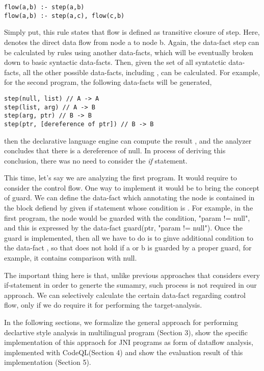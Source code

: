 \begin{lstlisting}[style=myDatalog,xleftmargin=2.5em]
flow(a,b) :- step(a,b)
flow(a,b) :- step(a,c), flow(c,b)
\end{lstlisting}

Simply put, this rule states that flow is defined as transitive closure of
step.  Here,  denotes the direct data flow from node a to
node b. Again, the data-fact step can be calculated by rules using another
data-facts, which will be eventually broken down to basic syntactic data-facts.
Then, given the set of all syntatctic data-facts, all the other possible
data-facts, including , can be calculated. For example, for the second
program, the following data-facts will be generated,

\begin{lstlisting}[style=myDatalog,xleftmargin=2.5em]
step(null, list) // A -> A
step(list, arg) // A -> B
step(arg, ptr) // B -> B
step(ptr, [dereference of ptr]) // B -> B
\end{lstlisting}

then the declarative language engine can compute the result , and the analyzer concludes that there is a dereference
of null. In process of deriving this conclusion, there was no need to consider
the \textit{if} statement.

This time, let's say we are analyzing the first program. It would require to
consider the control flow.  One way to implement it would be to bring the
concept of guard. We can define the data-fact  which
annotating the node is contained in the block defiend by given if statement
whose condition is .  For example, in the first program, the
 node would be guarded with the condition, "param != null", and
this is expressed by the data-fact guard(ptr, "param != null").  Once the guard
is implemented, then all we have to do is to ginve additional condition to the
data-fact , so that  does not hold if a or b
is guarded by a proper guard, for example, it contains comparison with null.

The important thing here is that, unlike previous approaches that considers
every if-statement in order to generte the sumamry, such process is not
required in our approach. We can selectively calculate the certain data-fact
regarding control flow, only if we do require it for performing the
target-analysis.

In the following sections, we formalize the general approach for performing
declartive style analysis in multilingual program (Section 3), show the
specific implementation of this appraoch for JNI programs as form of dataflow
analysis, implemented with CodeQL(Section 4) and show the evaluation result of
this implementation (Section 5).
